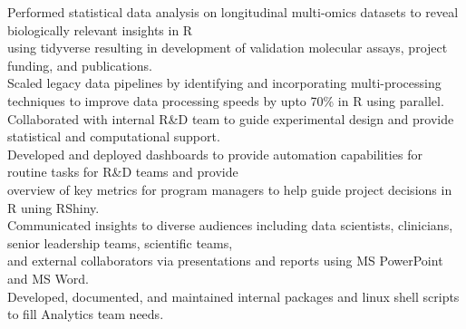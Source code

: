 \documentclass[a4paper]{article}
\newcommand{\mybullet}{
	\indent 
  \textbullet \hspace*{2mm}
}
\begin{document}
  \mybullet Performed statistical data analysis on longitudinal multi-omics datasets to reveal biologically relevant insights in R \\\hspace*{10mm}using tidyverse resulting in development of validation molecular assays, project funding, and publications. \\
  \mybullet Scaled legacy data pipelines by identifying and incorporating multi-processing techniques to improve data processing \hspace*{10mm}speeds by upto 70\% in R using parallel. \\
  \mybullet Collaborated with internal R\&D team to guide experimental design and provide statistical and computational support. \\
  \mybullet Developed and deployed dashboards to provide automation capabilities for routine tasks for R\&D teams and provide \\\hspace*{10mm}overview of key metrics for program managers to help guide project decisions in R uning RShiny. \\
  \mybullet Communicated insights to diverse audiences including data scientists, clinicians, senior leadership teams, scientific teams, \\\hspace*{10mm}and external collaborators via presentations and reports using MS PowerPoint and MS Word. \\
  \mybullet Developed, documented, and maintained internal packages and linux shell scripts to fill Analytics team needs. \\
\end{document}
